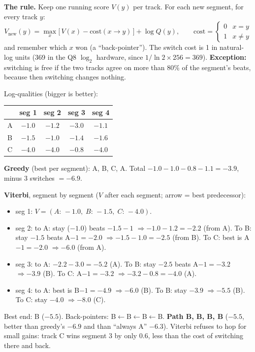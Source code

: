 \documentclass[11pt]{article}
\begin{document}
\textbf{The rule.} Keep one running score $V(y)$ per track. For each new segment, for every track $y$:
\[
V_\text{new}(y) = \max_x \big[\, V(x) - \text{cost}(x \to y) \,\big] + \log Q(y),
\qquad \text{cost} = \begin{cases} 0 & x = y \\ 1 & x \ne y \end{cases}
\]
and remember which $x$ won (a ``back-pointer''). The switch cost is 1 in natural-log units (369 in the Q8 $\log_2$ hardware, since $1/\ln 2 \times 256 = 369$). \textbf{Exception:} switching is free if the two tracks agree on more than 80\% of the segment's beats, because then switching changes nothing.

\begin{simple}
Log-qualities (bigger is better):
\begin{center}
\begin{tabular}{lcccc}
\toprule
 & seg 1 & seg 2 & seg 3 & seg 4 \\
\midrule
A & $-1.0$ & $-1.2$ & $-3.0$ & $-1.1$ \\
B & $-1.5$ & $-1.0$ & $-1.4$ & $-1.6$ \\
C & $-4.0$ & $-4.0$ & $-0.8$ & $-4.0$ \\
\bottomrule
\end{tabular}
\end{center}
\textbf{Greedy} (best per segment): A, B, C, A. Total $-1.0-1.0-0.8-1.1 = -3.9$, minus 3 switches $= -6.9$.\par
\textbf{Viterbi}, segment by segment ($V$ after each segment; arrow = best predecessor):
\begin{itemize}
  \item seg 1: $V = (A{:}\,-1.0,\; B{:}\,-1.5,\; C{:}\,-4.0)$.
  \item seg 2: to A: stay ($-1.0$) beats $-1.5-1$ $\Rightarrow -1.0-1.2 = -2.2$ (from A). To B: stay $-1.5$ beats A$-1 = -2.0$ $\Rightarrow -1.5-1.0 = -2.5$ (from B). To C: best is A$-1 = -2.0$ $\Rightarrow -6.0$ (from A).
  \item seg 3: to A: $-2.2-3.0 = -5.2$ (A). To B: stay $-2.5$ beats A$-1=-3.2$ $\Rightarrow -3.9$ (B). To C: A$-1=-3.2$ $\Rightarrow -3.2-0.8 = -4.0$ (A).
  \item seg 4: to A: best is B$-1 = -4.9$ $\Rightarrow -6.0$ (B). To B: stay $-3.9$ $\Rightarrow -5.5$ (B). To C: stay $-4.0$ $\Rightarrow -8.0$ (C).
\end{itemize}
Best end: B ($-5.5$). Back-pointers: B$\leftarrow$B$\leftarrow$B$\leftarrow$B. \textbf{Path B, B, B, B} ($-5.5$, better than greedy's $-6.9$ and than ``always A'' $-6.3$). Viterbi refuses to hop for small gains: track C wins segment 3 by only 0.6, less than the cost of switching there and back.\par

\end{simple}
\end{document}
